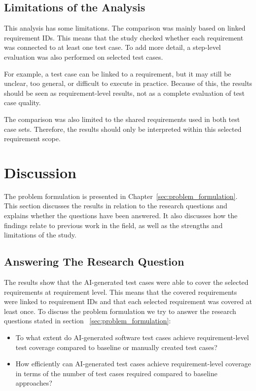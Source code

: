 \documentclass[a4paper,12pt]{article}
\begin{document}
\subsection{Limitations of the Analysis}
This analysis has some limitations. The comparison was mainly based on linked requirement IDs. This means that the study checked whether each requirement was connected to at least one test case. To add more detail, a step-level evaluation was also performed on selected test cases.

For example, a test case can be linked to a requirement, but it may still be unclear, too general, or difficult to execute in practice. Because of this, the results should be seen as requirement-level results, not as a complete evaluation of test case quality.

The comparison was also limited to the shared requirements used in both test case sets. Therefore, the results should only be interpreted within this selected requirement scope.


    
\newpage
	
\section{Discussion}
The problem formulation is presented in Chapter~\ref{sec:problem_formulation}. This section discusses the results in relation to the research questions and explains whether the questions have been answered. It also discusses how the findings relate to previous work in the field, as well as the strengths and limitations of the study. 

\subsection{Answering The Research Question}
The results show that the AI-generated test cases were able to cover the selected requirements at requirement level. This means that the covered requirements were linked to requirement IDs and that each selected requirement was covered at least once. To discuss the problem formulation we try to answer the research questions stated in section ~\ref{sec:problem_formulation}:

\begin{itemize}
    \item To what extent do AI-generated software test cases achieve requirement-level test coverage compared to baseline or manually created test cases? 
    \item How efficiently can AI-generated test cases achieve requirement-level coverage in terms of the number of test cases required compared to baseline approaches?
\end{itemize}
\end{document}
